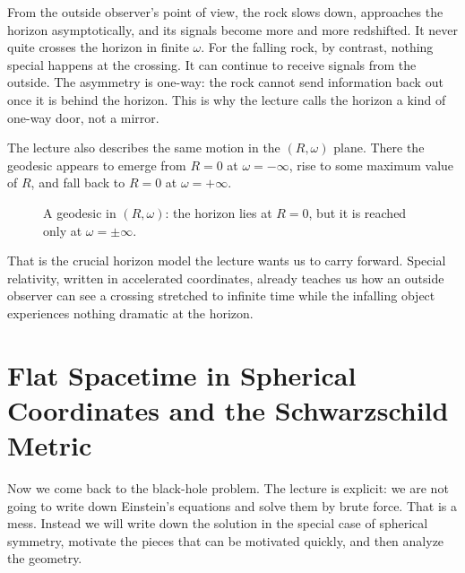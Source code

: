 From the outside observer's point of view, the rock slows down, approaches the horizon asymptotically, and its signals become more and more redshifted. It never quite crosses the horizon in finite \(\omega\). For the falling rock, by contrast, nothing special happens at the crossing. It can continue to receive signals from the outside. The asymmetry is one-way: the rock cannot send information back out once it is behind the horizon. This is why the lecture calls the horizon a kind of one-way door, not a mirror.

The lecture also describes the same motion in the \((R,\omega)\) plane. There the geodesic appears to emerge from \(R=0\) at \(\omega=-\infty\), rise to some maximum value of \(R\), and fall back to \(R=0\) at \(\omega=+\infty\).

\begin{figure}[t]
\centering
{}
\caption{A geodesic in \((R,\omega)\): the horizon lies at \(R=0\), but it is reached only at \(\omega=\pm\infty\).}
\end{figure}

That is the crucial horizon model the lecture wants us to carry forward. Special relativity, written in accelerated coordinates, already teaches us how an outside observer can see a crossing stretched to infinite time while the infalling object experiences nothing dramatic at the horizon.

\section{Flat Spacetime in Spherical Coordinates and the Schwarzschild Metric}

Now we come back to the black-hole problem. The lecture is explicit: we are not going to write down Einstein's equations and solve them by brute force. That is a mess. Instead we will write down the solution in the special case of spherical symmetry, motivate the pieces that can be motivated quickly, and then analyze the geometry.


